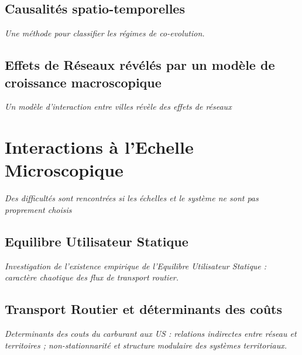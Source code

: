 \subsection{Causalités spatio-temporelles}


\textit{Une méthode pour classifier les régimes de co-evolution.}


\subsection{Effets de Réseaux révélés par un modèle de croissance macroscopique}


\textit{Un modèle d'interaction entre villes révèle des effets de réseaux}



\section{Interactions à l'Echelle Microscopique}

\textit{Des difficultés sont rencontrées si les échelles et le système ne sont pas proprement choisis}

\subsection{Equilibre Utilisateur Statique}

\textit{Investigation de l'existence empirique de l'Equilibre Utilisateur Statique : caractère chaotique des flux de transport routier.}


\subsection{Transport Routier et déterminants des coûts}

\textit{Determinants des couts du carburant aux US : relations indirectes entre réseau et territoires ; non-stationnarité et structure modulaire des systèmes territoriaux.}





